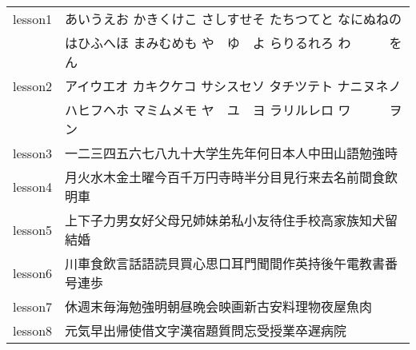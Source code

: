 \documentclass[extrafontsizes,20pt]{memoir}
\begin{document}
\begin{CJK}{UTF8}{min}

\begin{tabular}{c|l}

lesson1&
あいうえお
かきくけこ
さしすせそ
たちつてと
なにぬねの\\
&はひふへほ
まみむめも
や　ゆ　よ
らりるれろ
わ　　　を
ん\\
lesson2&
アイウエオ
カキクケコ
サシスセソ
タチツテト
ナニヌネノ\\
&ハヒフヘホ
マミムメモ
ヤ　ユ　ヨ
ラリルレロ
ワ　　　ヲ
ン\\
lesson3&一二三四五六七八九十大学生先年何日本人中田山語勉強時\\
lesson4&月火水木金土曜今百千万円寺時半分目見行来去名前間食飲明車\\
\hline
lesson5&上下子力男女好父母兄姉妹弟私小友待住手校高家族知犬留結婚\\
lesson6&川車食飲言話語読貝買心思口耳門聞間作英持後午電教書番号連歩\\
lesson7&休週末毎海勉強明朝昼晩会映画新古安料理物夜屋魚肉\\
lesson8&元気早出帰使借文字漢宿題質問忘受授業卒遅病院\\

\end{tabular}

\end{CJK}
\end{document}
